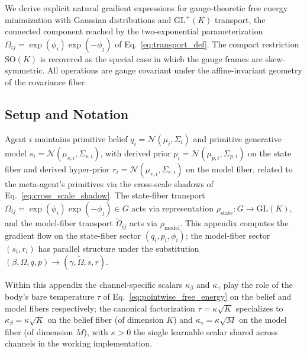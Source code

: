 \documentclass[11pt]{article}
\begin{document}
We derive explicit natural gradient expressions for gauge-theoretic free energy minimization with Gaussian distributions and $\mathrm{GL}^+(K)$ transport, the connected component reached by the two-exponential parameterization $\Omega_{ij} = \exp(\phi_i)\exp(-\phi_j)$ of Eq.~\eqref{eq:transport_def}. The compact restriction $\mathrm{SO}(K)$ is recovered as the special case in which the gauge frames are skew-symmetric. All operations are gauge covariant under the affine-invariant geometry of the covariance fiber.

\subsection*{Setup and Notation}

Agent $i$ maintains primitive belief $q_i = \mathcal{N}(\mu_i, \Sigma_i)$ and primitive generative model $s_i = \mathcal{N}(\mu_{s,i}, \Sigma_{s,i})$, with derived prior $p_i = \mathcal{N}(\mu_{p,i}, \Sigma_{p,i})$ on the state fiber and derived hyper-prior $r_i = \mathcal{N}(\mu_{r,i}, \Sigma_{r,i})$ on the model fiber, related to the meta-agent's primitives via the cross-scale shadows of Eq.~\eqref{eq:cross_scale_shadow}. The state-fiber transport $\Omega_{ij} = \exp(\phi_i)\exp(-\phi_j) \in G$ acts via representation $\rho_{\mathrm{state}}: G \to \mathrm{GL}(K)$, and the model-fiber transport $\tilde\Omega_{ij}$ acts via $\rho_{\mathrm{model}}$. This appendix computes the gradient flow on the state-fiber sector $(q_i, p_i, \phi_i)$; the model-fiber sector $(s_i, r_i)$ has parallel structure under the substitution $(\beta, \Omega, q, p) \to (\gamma, \tilde\Omega, s, r)$.

Within this appendix the channel-specific scalars $\kappa_\beta$ and $\kappa_\gamma$ play the role of the body's bare temperature $\tau$ of Eq.~\eqref{eq:pointwise_free_energy} on the belief and model fibers respectively; the canonical factorization $\tau = \kappa\sqrt{K}$ specializes to $\kappa_\beta = \kappa\sqrt{K}$ on the belief fiber (of dimension $K$) and $\kappa_\gamma = \kappa\sqrt{M}$ on the model fiber (of dimension $M$), with $\kappa > 0$ the single learnable scalar shared across channels in the working implementation.
\end{document}
